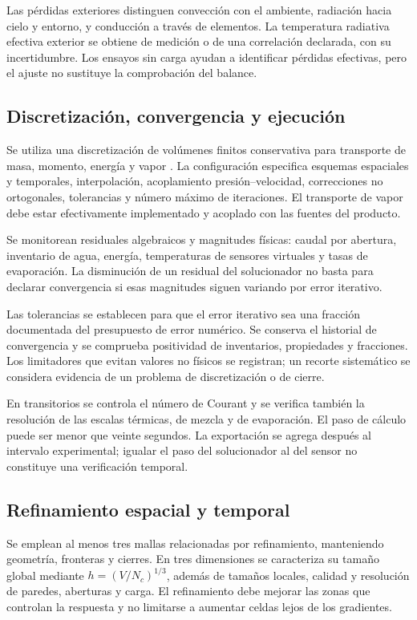 Las pérdidas exteriores distinguen convección con el ambiente, radiación hacia cielo y entorno, y conducción a través de elementos. La temperatura radiativa efectiva exterior se obtiene de medición o de una correlación declarada, con su incertidumbre. Los ensayos sin carga ayudan a identificar pérdidas efectivas, pero el ajuste no sustituye la comprobación del balance.

\subsection{Discretización, convergencia y ejecución}

Se utiliza una discretización de volúmenes finitos conservativa para transporte de masa, momento, energía y vapor \cite{patankar1980,versteeg2007}. La configuración especifica esquemas espaciales y temporales, interpolación, acoplamiento presión--velocidad, correcciones no ortogonales, tolerancias y número máximo de iteraciones. El transporte de vapor debe estar efectivamente implementado y acoplado con las fuentes del producto.

Se monitorean residuales algebraicos y magnitudes físicas: caudal por abertura, inventario de agua, energía, temperaturas de sensores virtuales y tasas de evaporación. La disminución de un residual del solucionador no basta para declarar convergencia si esas magnitudes siguen variando por error iterativo.

Las tolerancias se establecen para que el error iterativo sea una fracción documentada del presupuesto de error numérico. Se conserva el historial de convergencia y se comprueba positividad de inventarios, propiedades y fracciones. Los limitadores que evitan valores no físicos se registran; un recorte sistemático se considera evidencia de un problema de discretización o de cierre.

En transitorios se controla el número de Courant y se verifica también la resolución de las escalas térmicas, de mezcla y de evaporación. El paso de cálculo puede ser menor que veinte segundos. La exportación se agrega después al intervalo experimental; igualar el paso del solucionador al del sensor no constituye una verificación temporal.

\subsection{Refinamiento espacial y temporal}
\label{met:refinamiento}

Se emplean al menos tres mallas relacionadas por refinamiento, manteniendo geometría, fronteras y cierres. En tres dimensiones se caracteriza su tamaño global mediante $h=(V/N_c)^{1/3}$, además de tamaños locales, calidad y resolución de paredes, aberturas y carga. El refinamiento debe mejorar las zonas que controlan la respuesta y no limitarse a aumentar celdas lejos de los gradientes.

